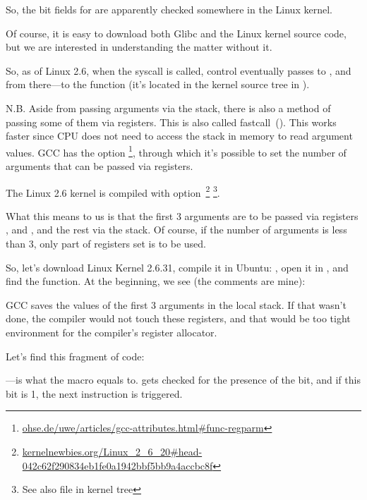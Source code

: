 So, the bit fields for  are apparently checked somewhere in the Linux kernel.

Of course, it is easy to download both Glibc and the Linux kernel source code, 
but we are interested in understanding the matter without it.

So, as of Linux 2.6, when the  syscall is called, control eventually passes to ,
and from there---to the  function (it's located in the kernel source tree in ).

\newcommand{\URLREGPARM}{\href{http://go.yurichev.com/17040}{ohse.de/uwe/articles/gcc-attributes.html\#func-regparm}}

\label{regparm}
N.B.  Aside from passing arguments via the stack,
there is also a method of passing some of them
via registers. This is also called fastcall~().
This works faster since CPU does not need to access the stack in memory to read argument values.
GCC has the option \footnote{\URLREGPARM},
through which it's possible to set the number of arguments that can be passed via registers.

\newcommand{\URLKERNELNEWB}{\href{http://go.yurichev.com/17066}{kernelnewbies.org/Linux\_2\_6\_20\#head-042c62f290834eb1fe0a1942bbf5bb9a4accbc8f}}
\newcommand{\CALLINGHFILE}{arch/x86/include/asm/calling.h}

The Linux 2.6 kernel is compiled with  option~\footnote{\URLKERNELNEWB}
\footnote{See also \TT{\CALLINGHFILE} file in kernel tree}.

What this means to us is that the first 3 arguments are to be passed via registers \EAX, \EDX and \ECX, 
and the rest via the stack. 
Of course, if the number of arguments is less than 3, only part of registers set is to be used.

So, let's download Linux Kernel 2.6.31, compile it in Ubuntu: , open it in \IDA, 
and find the  function. At the beginning, we see (the comments are mine):



GCC saves the values of the first 3 arguments in the local stack. 
If that wasn't done, the compiler would not touch these registers, 
and that would be too tight environment for the compiler's \gls{register allocator}.

Let's find this fragment of code:



---is what the  macro equals to.
 gets checked for the presence of the  bit, and if this bit is 1, 
the next \JNZ instruction is triggered.
